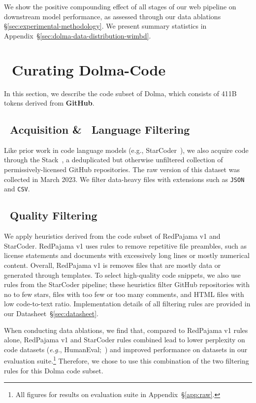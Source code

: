 \documentclass{article}
\newcommand{\dolma}{Dolma\xspace}
\newcommand{\dolmaCode}{{\color{VarnishRomeoFour}\faCode}\xspace}
\newcommand{\toolkitWget}{{\color{VarnishNovemberThree}\faDownload}\xspace}
\newcommand{\toolkitFilter}{{\color{VarnishNovemberThree}\faFilter}\xspace}
\begin{document}
We show the positive compounding effect of all stages of our web pipeline on downstream model performance, as assessed through our data ablations \S\ref{sec:experimental-methodology}.
We present summary statistics in Appendix~\S\ref{sec:dolma-data-distribution-wimbd}.

\section{\dolmaCode~Curating Dolma-Code}
\label{sec:curating-dolma-code}

In this section, we describe the code subset of \dolma, which consists of 411B tokens derived from \textbf{GitHub}.

\subsection{\toolkitWget~Acquisition \& \toolkitFilter~Language Filtering}

Like prior work in code language models (e.g., StarCoder~\citep{Li2023StarCoderMT}), we also acquire code through the Stack~\citep{kocetkov2022stack}, a deduplicated but otherwise unfiltered collection of permissively-licensed GitHub repositories.
The raw version of this dataset was collected in March 2023.
We filter data-heavy 
files with extensions such as \texttt{JSON} and \texttt{CSV}.

\subsection{\toolkitFilter~Quality Filtering} 

We apply heuristics derived from the code subset of RedPajama v1 and StarCoder. 
RedPajama v1 uses rules to remove repetitive file preambles, such as license statements
and documents with excessively long lines or mostly numerical content. 
Overall, RedPajama v1 is removes files that are mostly data or generated through templates.
To select high-quality code snippets, we also use rules from the StarCoder pipeline;
these heuristics filter GitHub repositories with no to few stars, files with too few or too many comments, and HTML files with low code-to-text ratio.
Implementation details of all filtering rules are provided in our Datasheet~\S\ref{sec:datasheet}.

When conducting data ablations, we find that, compared to RedPajama v1 rules alone, RedPajama v1 and StarCoder rules combined lead to lower perplexity on code datasets (\textit{e.g.}, HumanEval;~\citealp{chen2021evaluating}) and
improved performance on datasets in our evaluation suite.\footnote{All figures for results on evaluation suite in Appendix~\S\ref{app:raw}.
}
Therefore, we chose to use this combination of the two filtering rules for this \dolma code subset.
\end{document}
